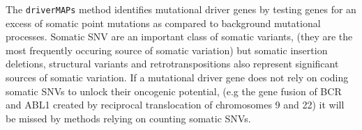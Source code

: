 











The \texttt{driverMAPs} method identifies mutational driver genes by testing genes for an excess of somatic point mutations as compared to background mutational processes. Somatic SNV are an important class of somatic variants, (they are the most frequently occuring source of somatic variation) but somatic insertion deletions, structural variants and retrotranspositions also represent significant sources of somatic variation\cite{PANCAN}.  If a mutational driver gene does not rely on coding somatic SNVs to unlock their oncogenic potential, (e.g the gene fusion of BCR and ABL1 created by reciprocal translocation of chromosomes 9 and 22\cite{philly}) it will be missed by methods relying on counting somatic SNVs.